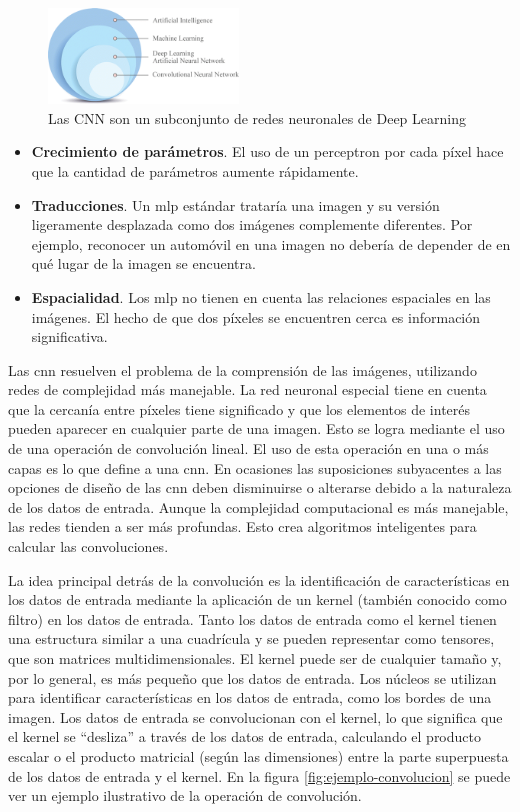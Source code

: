\begin{figure}[ht]
\centering
\includegraphics[width=0.45\textwidth]{img/chapters/estado-del-arte/cnn-radiologic.png}
\caption{\label{fig:cnn-dlnn}Las CNN son un subconjunto de redes neuronales de Deep Learning \cite{ankile2020deep}}
\end{figure}

\begin{itemize}
    \item \textbf{Crecimiento de parámetros}. El uso de un perceptron por cada píxel hace que la cantidad de parámetros aumente rápidamente.
    \item \textbf{Traducciones}. Un \gls{mlp} estándar trataría una imagen y su versión ligeramente desplazada como dos imágenes complemente diferentes. Por ejemplo, reconocer un automóvil en una imagen no debería de depender de en qué lugar de la imagen se encuentra.
    \item \textbf{Espacialidad}. Los \gls{mlp} no tienen en cuenta las relaciones espaciales en las imágenes. El hecho de que dos píxeles se encuentren cerca es información significativa.
\end{itemize}

Las \gls{cnn} resuelven el problema de la comprensión de las imágenes, utilizando redes de complejidad más manejable. La red neuronal especial tiene en cuenta que la cercanía entre píxeles tiene significado y que los elementos de interés pueden aparecer en cualquier parte de una imagen. Esto se logra mediante el uso de una operación de convolución lineal. El uso de esta operación en una o más capas es lo que define a una \gls{cnn}. En ocasiones las suposiciones subyacentes a las opciones de diseño de las \gls{cnn} deben disminuirse o alterarse debido a la naturaleza de los datos de entrada. Aunque la complejidad computacional es más manejable, las redes tienden a ser más profundas. Esto crea algoritmos inteligentes para calcular las convoluciones.

La idea principal detrás de la convolución es la identificación de características en los datos de entrada mediante la aplicación de un kernel (también conocido como filtro) en los datos de entrada. Tanto los datos de entrada como el kernel tienen una estructura similar a una cuadrícula y se pueden representar como tensores, que son matrices multidimensionales. El kernel puede ser de cualquier tamaño y, por lo general, es más pequeño que los datos de entrada. Los núcleos se utilizan para identificar características en los datos de entrada, como los bordes de una imagen. Los datos de entrada se convolucionan con el kernel, lo que significa que el kernel se ``desliza'' a través de los datos de entrada, calculando el producto escalar o el producto matricial (según las dimensiones) entre la parte superpuesta de los datos de entrada y el kernel. En la figura \ref{fig:ejemplo-convolucion} se puede ver un ejemplo ilustrativo de la operación de convolución.

